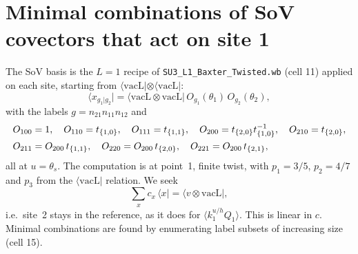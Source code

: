 \documentclass[11pt]{article}
\newcommand{\vacL}{\langle\mathrm{vacL}|}
\newcommand{\nb}[1]{\texttt{#1}}
\theoremstyle{definition}
\theoremstyle{remark}
\begin{document}
\section{Minimal combinations of SoV covectors that act on site 1}\label{sec:sov}

The SoV basis is the $L=1$ recipe of \nb{SU3\_L1\_Baxter\_Twisted.wb} (cell 11) applied on each site, starting from $\vacL\otimes\vacL$:
\begin{equation}
\langle x_{g_1|g_2}|=\langle\mathrm{vacL}\otimes\mathrm{vacL}|\,O_{g_1}(\theta_1)\,O_{g_2}(\theta_2),
\end{equation}
with the labels $g=n_{21}n_{11}n_{12}$ and
\begin{align}
&O_{100}=1,\quad O_{110}=t_{\{1,0\}},\quad O_{111}=t_{\{1,1\}},\quad O_{200}=t_{\{2,0\}}t_{\{1,0\}}^{-1},\quad O_{210}=t_{\{2,0\}},\notag\\
&O_{211}=O_{200}\,t_{\{1,1\}},\quad O_{220}=O_{200}\,t_{\{2,0\}},\quad O_{221}=O_{200}\,t_{\{2,1\}},
\end{align}
all at $u=\theta_s$. The computation is at point~1, finite twist, with $p_1=3/5$, $p_2=4/7$ and $p_3$ from the $\vacL$ relation. We seek
\begin{equation}
\sum_xc_x\,\langle x|=\langle v\otimes\mathrm{vacL}|,
\end{equation}
i.e.\ site~2 stays in the reference, as it does for $\langle k_1^{u/h}Q_1\rangle$. This is linear in $c$. Minimal combinations are found by enumerating label subsets of increasing size (cell 15).
\end{document}
